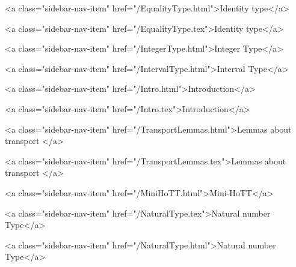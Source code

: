       
        
          <a class="sidebar-nav-item" href="/EqualityType.html">Identity type</a>
        
      
    
      
        
          <a class="sidebar-nav-item" href="/EqualityType.tex">Identity type</a>
        
      
    
      
        
          <a class="sidebar-nav-item" href="/IntegerType.html">Integer Type</a>
        
      
    
      
        
          <a class="sidebar-nav-item" href="/IntervalType.html">Interval Type</a>
        
      
    
      
        
          <a class="sidebar-nav-item" href="/Intro.html">Introduction</a>
        
      
    
      
        
          <a class="sidebar-nav-item" href="/Intro.tex">Introduction</a>
        
      
    
      
        
          <a class="sidebar-nav-item" href="/TransportLemmas.html">Lemmas about transport </a>
        
      
    
      
        
          <a class="sidebar-nav-item" href="/TransportLemmas.tex">Lemmas about transport </a>
        
      
    
      
        
          <a class="sidebar-nav-item" href="/MiniHoTT.html">Mini-HoTT</a>
        
      
    
      
        
          <a class="sidebar-nav-item" href="/NaturalType.tex">Natural number Type</a>
        
      
    
      
        
          <a class="sidebar-nav-item" href="/NaturalType.html">Natural number Type</a>
        
      
    
